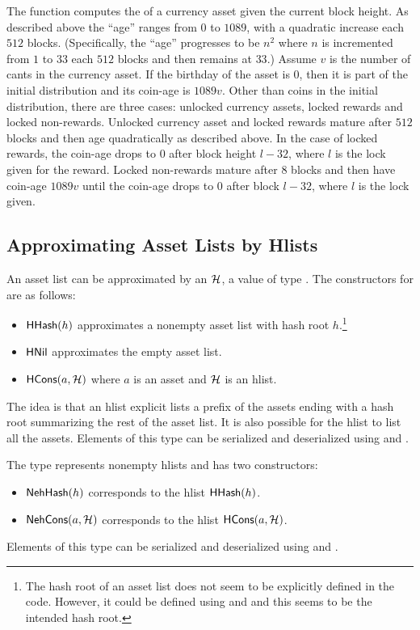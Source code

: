 The function {} computes the {} of a
currency asset given the current block height.
As described above the ``age'' ranges from $0$ to $1089$,
with a quadratic increase each $512$ blocks.
(Specifically, the ``age'' progresses to be $n^2$
where $n$ is incremented from $1$ to $33$ each $512$ blocks
and then remains at $33$.)
Assume $v$ is the number of cants in the currency asset.
If the birthday of the asset is $0$, then it is part of the initial distribution
and its coin-age is $1089 v$.
Other than coins in the initial distribution,
there are three cases: unlocked currency assets, locked rewards and locked non-rewards.
Unlocked currency asset and locked rewards mature after $512$ blocks and then age quadratically
as described above. In the case of locked rewards, the coin-age drops to $0$
after block height $l-32$, where $l$ is the lock given for the reward.
Locked non-rewards mature after $8$ blocks and then have coin-age $1089 v$
until the coin-age drops to $0$ after block $l-32$, where $l$ is the lock given.

\subsection{Approximating Asset Lists by Hlists}

An asset list can be approximated by an {} $\mathcal{H}$, a value of type {}.
The constructors for {} are as follows:
\begin{itemize}
\item ${\constr{HHash}}(h)$ approximates a nonempty asset list with hash root $h$.\footnote{The hash root of an asset list does not seem to be explicitly defined in the code. However, it could be defined using {} and {} and this seems to be the intended hash root.}
\item ${\constr{HNil}}$ approximates the empty asset list.
\item ${\constr{HCons}}(a,\cH)$ where $a$ is an asset and $\mathcal{H}$ is an hlist.
\end{itemize}
The idea is that an hlist explicit lists a prefix of the assets ending with a hash root
summarizing the rest of the asset list. It is also possible for the hlist to list all the assets.
Elements of this type can be serialized and deserialized using
{}
and {}.

The type {} represents nonempty hlists and has two constructors:
\begin{itemize}
\item ${\constr{NehHash}}(h)$ corresponds to the hlist ${\constr{HHash}}(h)$.
\item ${\constr{NehCons}}(a,\cH)$ corresponds to the hlist ${\constr{HCons}}(a,\cH)$.
\end{itemize}
Elements of this type can be serialized and deserialized using
{}
and
{}.

